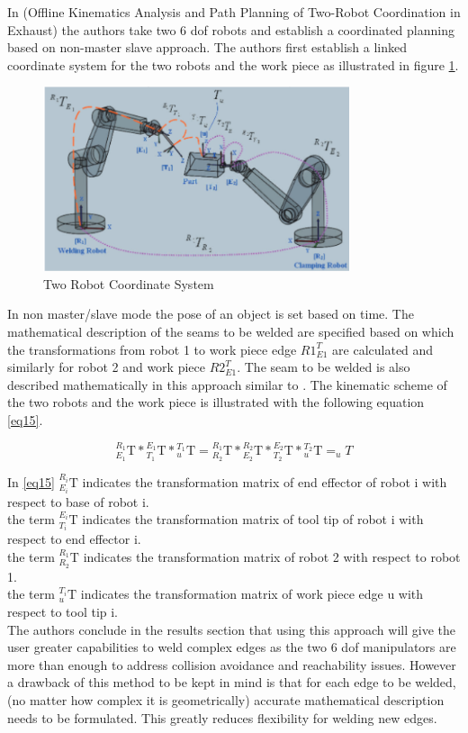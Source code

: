 In \cite{6}(Offline Kinematics Analysis and Path Planning of Two-Robot Coordination in Exhaust) the authors take two 6 dof robots and establish a coordinated planning based on non-master slave approach. 
The authors first establish a linked coordinate system for the two robots and the work piece as illustrated in figure \ref{fig:img4}.
\begin{figure}[htbp] %
 \centering
   \includegraphics[width=9cm]{images/JointCoordinate2robs.png}
   \caption[Two Robot Coordinate System]
   {Two Robot Coordinate System \footnotemark[\value{footnote}]}  
\label{fig:img4}
\end{figure}
In non master/slave mode the pose of an object is set based on time. The mathematical description of the seams to be welded are specified based on which the transformations from robot 1 to work piece edge ${R1}^T_{E1} $ are calculated and similarly for robot 2 and work piece ${R2}^T_{E1}$. The seam to be welded is also described mathematically in this approach similar to \cite{7}. The kinematic scheme of the two robots and the work piece is illustrated with the following equation \eqref{eq15}.

\begin{equation}
\label{eq15}
{_{E_{1}}^{R_{1}}\textrm{T}} *{_{T_{1}}^{E_{1}}\textrm{T}} *{_{u}^{T_{1}}\textrm{T}} = {_{R_{2}}^{R_{1}}\textrm{T}} *{_{E_{2}}^{R_{2}}\textrm{T}}*{_{T_{2}}^{E_{2}}\textrm{T}} *{_{u}^{T_{2}}\textrm{T}} = _{u}T
\end{equation}

In \eqref{eq15} ${_{E_{i}}^{R_{i}}\textrm{T}} $ indicates the transformation matrix of end effector of robot i with respect to base of robot i. \\
the term ${_{T_{i}}^{E_{i}}\textrm{T}} $ indicates the transformation matrix of tool tip of robot i with respect to end effector i. \\ 
the term ${_{R_{2}}^{R_{1}}\textrm{T}} $ indicates the transformation matrix of robot 2 with respect to robot 1. \\ 
the term ${_{u}^{T_{i}}\textrm{T}} $ indicates the transformation matrix of work piece edge u with respect to tool tip i.\\
The authors conclude in the results section that using this approach will give the user greater capabilities to weld complex edges as the two 6 dof manipulators are more than enough to address collision avoidance and reachability issues. However a drawback of this method to be kept in mind is that for each edge to be welded, (no matter how complex it is geometrically) accurate mathematical description needs to be formulated. This greatly reduces flexibility for welding new edges. 

